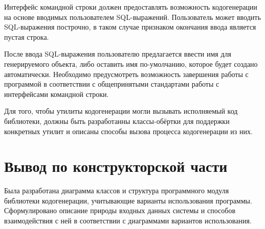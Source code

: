Интерфейс командной строки должен предоставлять возможность кодогенерации на основе вводимых пользователем SQL-выражений.
Пользователь может вводить SQL-выражения построчно, в таком случае признаком окончания ввода является пустая строка.

После ввода SQL-выражения пользователю предлагается ввести имя для генерируемого объекта, либо оставить имя по-умолчанию, которое будет создано автоматически.
Необходимо предусмотреть возможность завершения работы с программой в соответствии с общепринятыми стандартами работы с интерфейсами командной строки.

Для того, чтобы утилиты кодогенерации могли вызывать исполняемый код библиотеки, должны быть разработанны классы-обёртки для поддержки конкретных утилит и описаны способы вызова процесса кодогенерации из них.

\section*{Вывод по конструкторской части}
Была разработана диаграмма классов и структура программного модуля библиотеки кодогенерации, учитывающие варианты использования программы.
Сформулировано описание природы входных данных системы и способов взаимодействия с ней в соответствии с диаграммами вариантов использования.